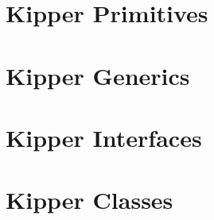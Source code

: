 \section{Kipper Primitives}
\label{sec:kipper-primitives}

\section{Kipper Generics}
\label{sec:kipper-generics}

\section{Kipper Interfaces}
\label{sec:kipper-interfaces}

\section{Kipper Classes}
\label{sec:kipper-classes}
